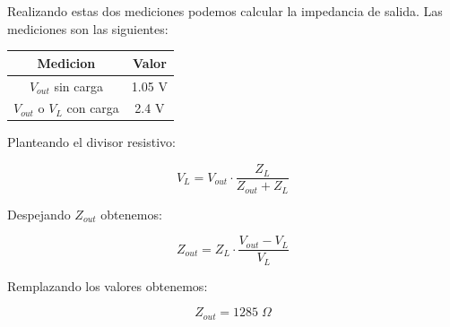 Realizando estas dos mediciones podemos calcular la impedancia de salida. Las mediciones son las siguientes:

\begin{table}[h]
    \centering
    \begin{tabular}{|c|c|}
    \hline
    \rowcolor[HTML]{C0C0C0} 
    \textbf{Medicion} & \textbf{Valor} \\ \hline
    $V_{out}$ sin carga            & 1.05  V         \\ \hline
    $V_{out}$ o $V_{L}$ con carga         & 2.4 V         \\ \hline
    \end{tabular}
\end{table}

Planteando el divisor resistivo:

\begin{equation}
    V_{L} = V_{out} \cdot \frac{Z_{L}}{Z_{out} + Z_L}
\end{equation}

Despejando $Z_{out}$ obtenemos:

\begin{equation}
    Z_{out} = Z_L \cdot \frac{V_{out} - V_L}{V_L}
\end{equation}

Remplazando los valores obtenemos:

\begin{equation}
    Z_{out} = 1285\; \Omega
\end{equation}

